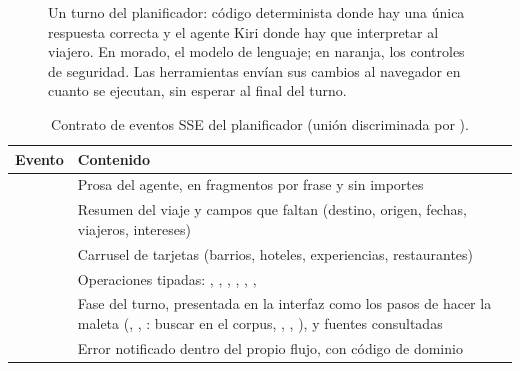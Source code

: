 \begin{figure}[t]
{}
\caption{Un turno del planificador: código determinista donde hay una única respuesta correcta y el agente Kiri donde hay que interpretar al viajero. En morado, el modelo de lenguaje; en naranja, los controles de seguridad. Las herramientas envían sus cambios al navegador en cuanto se ejecutan, sin esperar al final del turno.}\label{fig:turno}
\end{figure}

\begin{table}[t]
\centering\scriptsize
\caption{Contrato de eventos SSE del planificador (unión discriminada por ).}\label{tab:sse}
\begin{tabularx}{\columnwidth}{@{}L{1.85cm}Y@{}}
\toprule
\textbf{Evento} & \textbf{Contenido} \\
\midrule
{} & Prosa del agente, en fragmentos por frase y sin importes \\
 & Resumen del viaje y campos que faltan (destino, origen, fechas, viajeros, intereses) \\
 & Carrusel de tarjetas (barrios, hoteles, experiencias, restaurantes) \\
 & Operaciones tipadas: , , , , , ,  \\
 & Fase del turno, presentada en la interfaz como los pasos de hacer la maleta (, , : buscar en el corpus, , , ), y fuentes consultadas \\
 & Error notificado dentro del propio flujo, con código de dominio \\
\bottomrule
\end{tabularx}
\end{table}

